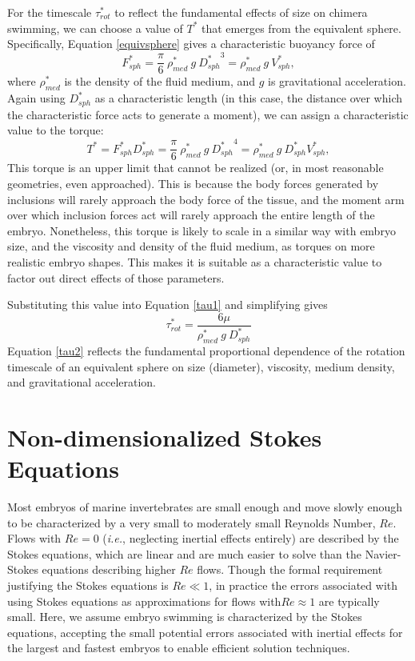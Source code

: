\documentclass[10pt,a4paper]{article}
\begin{document}
For the timescale $\tau_{rot}^*$ to reflect the fundamental effects of size on chimera swimming, we can choose a value of $T^*$ that emerges from the equivalent sphere.
Specifically, Equation \ref{equivsphere} gives a characteristic buoyancy force of
\begin{equation}\label{charF}
	F_{sph}^* = \frac{\pi}{6} ~ \rho_{med}^* ~ g ~ {D_{sph}^*}^3 = \rho_{med}^* ~ g ~ V_{sph}^*,
\end{equation} 
where $\rho_{med}^*$ is the density of the fluid medium, and $g$ is gravitational acceleration.
Again using $D_{sph}^*$ as a characteristic length (in this case, the distance over which the characteristic force acts to generate a moment), we can assign a characteristic value to the torque:
\begin{equation}\label{charT}
	T^* = F_{sph}^* D_{sph}^* = \frac{\pi}{6} ~ \rho_{med}^* ~ g ~ {D_{sph}^*}^4 = \rho_{med}^* ~ g ~ D_{sph}^* V_{sph}^*,
\end{equation} 
This torque is an upper limit that cannot be realized (or, in most reasonable geometries, even approached).
This is because the body forces generated by inclusions will rarely approach the body force of the tissue, and the moment arm over which inclusion forces act will rarely approach the entire length of the embryo. 
Nonetheless, this torque is likely to scale in a similar way with embryo size, and the viscosity and density of the fluid medium, as torques on more realistic embryo shapes. This makes it is suitable as a characteristic value to factor out direct effects of those parameters.

Substituting this value into Equation \ref{tau1} and simplifying gives
\begin{equation}\label{tau2}
	\tau_{rot}^* = \frac{6 \mu}{\rho^*_{med} ~ g ~ D_{sph}^*}
\end{equation}
Equation \ref{tau2} reflects the fundamental proportional dependence of the rotation timescale of an equivalent sphere on size (diameter), viscosity, medium density, and gravitational acceleration.


\section{Non-dimensionalized Stokes Equations}\label{NDStokesSect}
Most embryos of marine invertebrates are small enough and move slowly enough to be characterized by a very small to moderately small Reynolds Number, $Re$. 
Flows with $Re = 0$ (\textit{i.e.}, neglecting inertial effects entirely) are described by the Stokes equations, which are linear and are much easier to solve than the Navier-Stokes equations describing higher $Re$ flows.
Though the formal requirement justifying the Stokes equations is $Re \ll 1$, in practice the errors associated with using Stokes equations as approximations for flows with$Re \approx 1$ are typically small.
Here, we assume embryo swimming is characterized by the Stokes equations, accepting the small potential errors associated with inertial effects for the largest and fastest embryos to enable efficient solution techniques.
\end{document}
